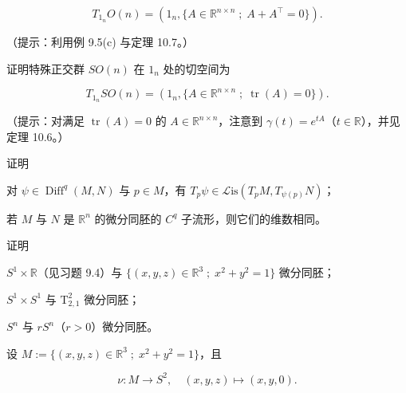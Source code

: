 \begin{exercises}
\[
T_{1_{n}}O(n) = (1_{n}, \{ A \in \mathbb{R}^{n\times n} \; ; \; A + A^{\top} = 0 \}) .
\]

（提示：利用例 9.5(c) 与定理 10.7。）

\item

证明特殊正交群 $ SO(n) $ 在 $ 1_{n} $ 处的切空间为

\[
T_{1_{n}}SO(n) = (1_{n}, \{ A \in \mathbb{R}^{n\times n} \; ; \; \operatorname{tr}(A) = 0 \}) .
\]

（提示：对满足 $ \operatorname{tr}(A) = 0 $ 的 $ A \in \mathbb{R}^{n\times n} $，注意到 $ \gamma(t) = e^{tA} $（$ t \in \mathbb{R} $），并见定理 10.6。）

\item

证明

\begin{items}
\item

对 $ \psi \in \operatorname{Diff}^{q}(M,N) $ 与 $ p \in M $，有 $ T_{p}\psi \in \mathcal{L}\mathrm{is}(T_{p}M,T_{\psi(p)}N) $；

\item

若 $ M $ 与 $ N $ 是 $ \mathbb{R}^{n} $ 的微分同胚的 $ C^{q} $ 子流形，则它们的维数相同。

\end{items}

\item

证明

\begin{items}
\item

$ S^{1} \times \mathbb{R} $（见习题 9.4）与 $ \{ (x,y,z) \in \mathbb{R}^{3} \; ; \; x^{2} + y^{2} = 1 \} $ 微分同胚；

\item

$ S^{1} \times S^{1} $ 与 $ \mathrm{T}_{2,1}^{2} $ 微分同胚；

\item

$ S^{n} $ 与 $ rS^{n} $（$ r > 0 $）微分同胚。

\end{items}

\item

设 $ M := \{ (x,y,z) \in \mathbb{R}^{3} \; ; \; x^{2} + y^{2} = 1 \} $，且

\[
\nu : M \to S^{2} , \quad (x,y,z) \mapsto (x,y,0) .
\]


\end{exercises}
